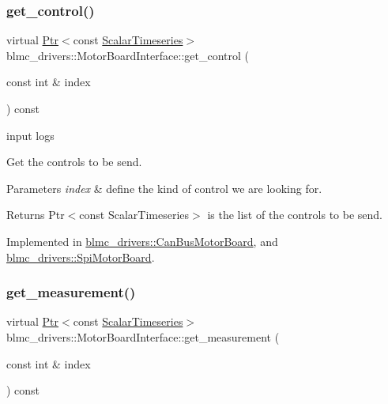 \subsubsection{\texorpdfstring{get\+\_\+control()}{get\_control()}}
{\footnotesize\ttfamily virtual \hyperlink{classblmc__drivers_1_1MotorBoardInterface_a6a733b7ed7a3a96f6b0712b6bb5307f8}{Ptr}$<$const \hyperlink{classblmc__drivers_1_1MotorBoardInterface_a14e237254ba495a66091ea3a3a33fa75}{Scalar\+Timeseries}$>$ blmc\+\_\+drivers\+::\+Motor\+Board\+Interface\+::get\+\_\+control (\begin{DoxyParamCaption}\item[{const int \&}]{index }\end{DoxyParamCaption}) const\hspace{0.3cm}{\ttfamily [pure virtual]}}



input logs 

Get the controls to be send.


\begin{DoxyParams}{Parameters}
{\em index} & define the kind of control we are looking for. \\
\hline
\end{DoxyParams}
\begin{DoxyReturn}{Returns}
Ptr$<$const Scalar\+Timeseries$>$ is the list of the controls to be send. 
\end{DoxyReturn}


Implemented in \hyperlink{classblmc__drivers_1_1CanBusMotorBoard_a2a1b44b08e57cd112957a33ceb97ebb4}{blmc\+\_\+drivers\+::\+Can\+Bus\+Motor\+Board}, and \hyperlink{classblmc__drivers_1_1SpiMotorBoard_a52791e9a5e9fd7db347c97b399bdeee8}{blmc\+\_\+drivers\+::\+Spi\+Motor\+Board}.

\mbox{\label{classblmc__drivers_1_1MotorBoardInterface_a34828a0375a3bd1fede4deb4fc74c04d}} 
\subsubsection{\texorpdfstring{get\+\_\+measurement()}{get\_measurement()}}
{\footnotesize\ttfamily virtual \hyperlink{classblmc__drivers_1_1MotorBoardInterface_a6a733b7ed7a3a96f6b0712b6bb5307f8}{Ptr}$<$const \hyperlink{classblmc__drivers_1_1MotorBoardInterface_a14e237254ba495a66091ea3a3a33fa75}{Scalar\+Timeseries}$>$ blmc\+\_\+drivers\+::\+Motor\+Board\+Interface\+::get\+\_\+measurement (\begin{DoxyParamCaption}\item[{const int \&}]{index }\end{DoxyParamCaption}) const\hspace{0.3cm}{\ttfamily [pure virtual]}}



